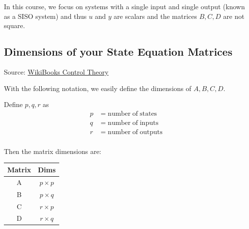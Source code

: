 In this course, we focus on systems with a single input and single output (known as a
SISO system) and thus $u$ and $y$ are scalars and the matrices $B,C,D$ are not square.

\subsection{Dimensions of your State Equation Matrices}Source: \href{https://en.wikibooks.org/wiki/Control_Systems/State-Space_Equations}{WikiBooks Control Theory}

With the following notation, we easily define the dimensions of $A,B,C,D$.

\vspace{0.25in}
\noindent
Define $p,q,r$ as
\[
\begin{aligned}
    p &= \mathrm{number\; of\; states}\\
    q &= \mathrm{number\; of\; inputs} \\
    r &= \mathrm{number\; of\; outputs} \\
\end{aligned}
\]

Then the matrix dimensions are:

\begin{center}
  \begin{tabular}{c|c}
  Matrix & Dims \\\hline
     A  & $p\times p$ \\
     B  & $p\times q$ \\
     C  & $r\times p$ \\
     D  & $r\times q$ \\
  \end{tabular}
\end{center}



